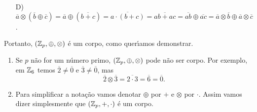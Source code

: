 \begin{prova}
\begin{enumerate}
\begin{align*}
			&\overline{ax} \oplus \overline{py} = \overline{1}\\
			&\overline{a} \otimes \overline{x} + \overline{p} \otimes \overline{y} = \overline{1}\\
			&\overline{a} \otimes \overline{x} = \overline{1}
		\end{align*}
		uma vez que $\overline{p} = \overline{0}$. Como $\overline{x}$ \'e obtido pelo resto da divis\~ao inteira de $x$ por $p$, ent\~ao 
		$\overline{x} \in \integer_p$. Observe que $x \ne 0$ pois $p \ge 2$ e $x \ne p$ pois sen\~ao $(a + p)y = 1$ o que \'e imposs{\'\i}vel uma vez que $p \ge 2$. Logo $\overline{x} \ne 0$ e assim todo elemento $\overline{a} \in \integer_p$ possui inverso multiplicativo.
		\item[D)] $\overline{a} \otimes (\overline{b} \oplus \overline{c}) = \overline{a} \oplus (\overline{b + c}) = \overline{a \cdot (b + c)} = \overline{ab + ac} = \overline{ab} \oplus \overline{ac} = \overline{a} \otimes \overline{b} \oplus \overline{a} \otimes \overline{c}$.
	\end{enumerate}
	Portanto, $(\mathbb{Z}_p, \oplus, \otimes)$ \'e um corpo, como quer{\'\i}amos demonstrar.
\end{prova}

\begin{observacao}
	\begin{enumerate}
		\item Se $p$ n\~ao for um n\'umero primo, $(\mathbb{Z}_p, \oplus, \otimes)$ pode n\~ao ser corpo. Por exemplo, em $\mathbb{Z}_6$ temos $\overline{2} \ne \overline{0}$ e $\overline{3} \ne \overline{0}$, mas
	\[
	  \overline{2}\otimes \overline{3} = \overline{2\cdot 3} = \overline{6} = \overline{0}.
	\]

	\item Para simplificar a nota\c{c}\~ao vamos denotar $\oplus$ por $+$ e $\otimes$ por $\cdot$. Assim vamos dizer simplesmente que $(\mathbb{Z}_p, +, \cdot)$ \'e um corpo.
	\end{enumerate}
\end{observacao}


